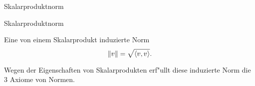 \documentclass[class=article, crop=false]{standalone}
\begin{document}
\begin{zettel}{Skalarproduktnorm}
\begin{flashcard}[edzsldrd]{Skalarproduktnorm}
	\begin{definition}[Skalarproduktnorm]
		Eine von einem Skalarprodukt induzierte Norm
		\[
			\left\|v\right\| = \sqrt{ \langle v,v\rangle}
		.\]
	\end{definition}

\end{flashcard}
\begin{remark}
	Wegen der Eigenschaften von Skalarprodukten erf"ullt diese induzierte Norm die $3$ Axiome von Normen.
\end{remark}
\end{zettel}
\end{document}

